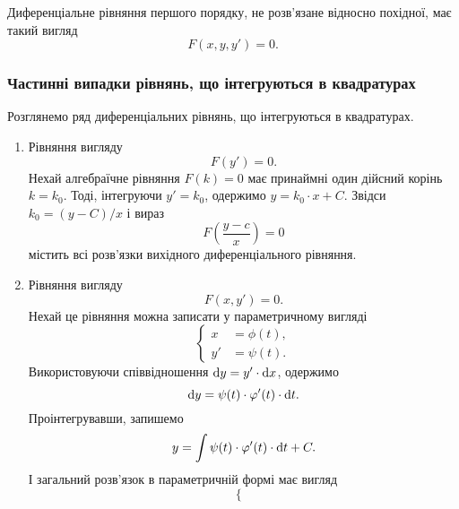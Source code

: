 Диференціальне рівняння першого порядку, не розв’язане відносно похідної, має такий вигляд
\begin{equation*}
	F(x, y, y') = 0. 	
\end{equation*}

\subsubsection{Частинні випадки рівнянь, що інтегруються в квадратурах}

Розглянемо ряд диференціальних рівнянь, що інтегруються в квадратурах.
\begin{enumerate}
	\item Рівняння вигляду 
	\begin{equation*}
		F(y') = 0.
	\end{equation*}
	Нехай алгебраїчне рівняння $F(k) = 0$ має принаймні один дійсний корінь $k = k_0$. Тоді, інтегруючи $y' = k_0$, одержимо $y = k_0 \cdot x + C$. Звідси $k_0 = (y - C) / x$ і вираз
	\begin{equation*}
		F \left( \frac{y - c}{x} \right) = 0	
	\end{equation*}
	містить всі розв’язки вихідного диференціального рівняння.
	\item Рівняння вигляду 
	\begin{equation*}
		F(x, y') = 0.
	\end{equation*}
	Нехай це рівняння можна записати у параметричному вигляді
	\begin{equation*}
		\left\{\begin{aligned}
			x &= \phi(t), \\
			y' &= \psi(t).
		\end{aligned}\right.
	\end{equation*}
	Використовуючи співвідношення $\mathop{}\!\mathrm{d} y = y ' \cdot \mathop{}\!\mathrm{d} x$, одержимо 
	\begin{equation*}
		\mathop{}\!\mathrm{d} y = \psi(t) \cdot \varphi'(t) \cdot \mathop{}\!\mathrm{d} t.
	\end{equation*}
	Проінтегрувавши, запишемо
	\begin{equation*}
		y = \int \psi(t) \cdot \varphi'(t) \cdot \mathop{}\!\mathrm{d} t + C.
	\end{equation*}
	І загальний розв’язок в параметричній формі має вигляд
	\begin{equation*}
		\left\{\begin{aligned}

\end{aligned}
\end{equation*}
\end{enumerate}
